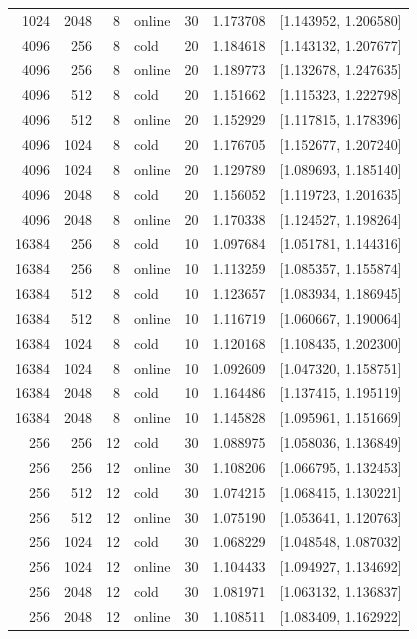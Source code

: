 \begin{longtable}{rrrlrrr}
1024 & 2048 & 8 & online & 30 & 1.173708 & [1.143952, 1.206580] \\
4096 & 256 & 8 & cold & 20 & 1.184618 & [1.143132, 1.207677] \\
4096 & 256 & 8 & online & 20 & 1.189773 & [1.132678, 1.247635] \\
4096 & 512 & 8 & cold & 20 & 1.151662 & [1.115323, 1.222798] \\
4096 & 512 & 8 & online & 20 & 1.152929 & [1.117815, 1.178396] \\
4096 & 1024 & 8 & cold & 20 & 1.176705 & [1.152677, 1.207240] \\
4096 & 1024 & 8 & online & 20 & 1.129789 & [1.089693, 1.185140] \\
4096 & 2048 & 8 & cold & 20 & 1.156052 & [1.119723, 1.201635] \\
4096 & 2048 & 8 & online & 20 & 1.170338 & [1.124527, 1.198264] \\
16384 & 256 & 8 & cold & 10 & 1.097684 & [1.051781, 1.144316] \\
16384 & 256 & 8 & online & 10 & 1.113259 & [1.085357, 1.155874] \\
16384 & 512 & 8 & cold & 10 & 1.123657 & [1.083934, 1.186945] \\
16384 & 512 & 8 & online & 10 & 1.116719 & [1.060667, 1.190064] \\
16384 & 1024 & 8 & cold & 10 & 1.120168 & [1.108435, 1.202300] \\
16384 & 1024 & 8 & online & 10 & 1.092609 & [1.047320, 1.158751] \\
16384 & 2048 & 8 & cold & 10 & 1.164486 & [1.137415, 1.195119] \\
16384 & 2048 & 8 & online & 10 & 1.145828 & [1.095961, 1.151669] \\
256 & 256 & 12 & cold & 30 & 1.088975 & [1.058036, 1.136849] \\
256 & 256 & 12 & online & 30 & 1.108206 & [1.066795, 1.132453] \\
256 & 512 & 12 & cold & 30 & 1.074215 & [1.068415, 1.130221] \\
256 & 512 & 12 & online & 30 & 1.075190 & [1.053641, 1.120763] \\
256 & 1024 & 12 & cold & 30 & 1.068229 & [1.048548, 1.087032] \\
256 & 1024 & 12 & online & 30 & 1.104433 & [1.094927, 1.134692] \\
256 & 2048 & 12 & cold & 30 & 1.081971 & [1.063132, 1.136837] \\
256 & 2048 & 12 & online & 30 & 1.108511 & [1.083409, 1.162922] \\

\end{longtable}
